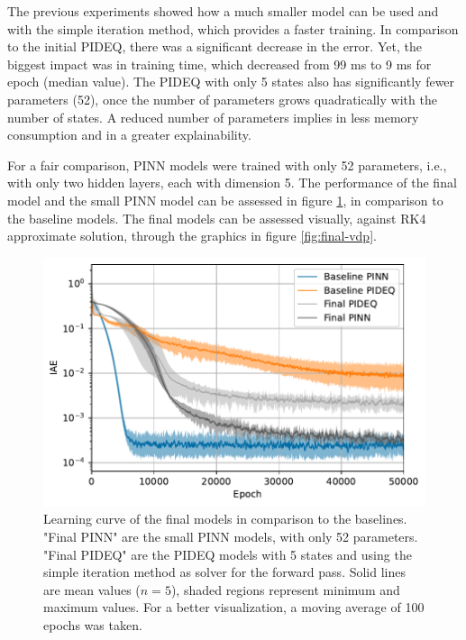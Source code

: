The previous experiments showed how a much smaller model can be used and with the simple iteration method, which provides a faster training.
In comparison to the initial \gls{PIDEQ}, there was a significant decrease in the error.
Yet, the biggest impact was in training time, which decreased from 99 ms to 9 ms for epoch (median value). 
The \gls{PIDEQ} with only 5 states also has significantly fewer parameters (52), once the number of parameters grows quadratically with the number of states.
A reduced number of parameters implies in less memory consumption and in a greater explainability.

For a fair comparison, \gls{PINN} models were trained with only 52 parameters, i.e., with only two hidden layers, each with dimension 5.
The performance of the final model and the small \gls{PINN} model can be assessed in figure \ref{fig:final-iae}, in comparison to the baseline models. The final models can be assessed visually, against \gls{RK4} approximate solution, through the graphics in figure \ref{fig:final-vdp}.

\begin{figure}[h]
    \centering
    \includegraphics{images/final_iae.pdf}
    \caption{Learning curve of the final models in comparison to the baselines. "Final PINN" are the small \gls{PINN} models, with only 52 parameters. "Final PIDEQ" are the \gls{PIDEQ} models with 5 states and using the simple iteration method as solver for the forward pass. Solid lines are mean values ($n=5$), shaded regions represent minimum and maximum values. For a better visualization, a moving average of 100 epochs was taken.}
    \label{fig:final-iae}
\end{figure}

